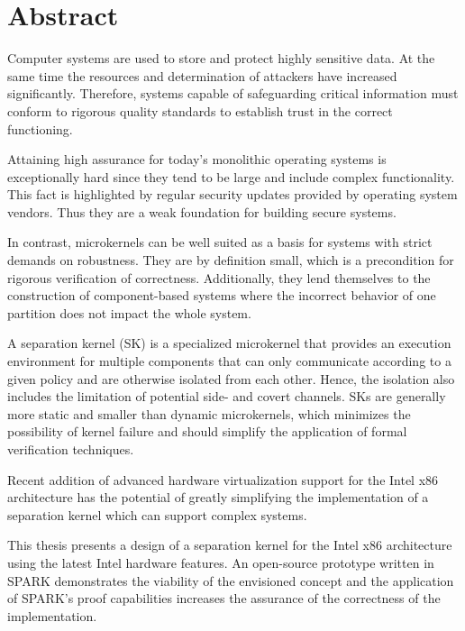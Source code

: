 \chapter*{Abstract}
Computer systems are used to store and protect highly sensitive data. At the
same time the resources and determination of attackers have increased
significantly. Therefore, systems capable of safeguarding critical information
must conform to rigorous quality standards to establish trust in the correct
functioning.

Attaining high assurance for today's monolithic operating systems is
exceptionally hard since they tend to be large and include complex
functionality. This fact is highlighted by regular security updates provided by
operating system vendors. Thus they are a weak foundation for building secure
systems.

In contrast, microkernels can be well suited as a basis for systems with strict
demands on robustness. They are by definition small, which is a precondition
for rigorous verification of correctness. Additionally, they lend themselves to
the construction of component-based systems where the incorrect behavior of one
partition does not impact the whole system.

A separation kernel (SK) is a specialized microkernel that provides an
execution environment for multiple components that can only communicate
according to a given policy and are otherwise isolated from each other. Hence,
the isolation also includes the limitation of potential side- and covert
channels. SKs are generally more static and smaller than dynamic
microkernels, which minimizes the possibility of kernel failure and should
simplify the application of formal verification techniques.

Recent addition of advanced hardware virtualization support for the Intel x86
architecture has the potential of greatly simplifying the implementation of a
separation kernel which can support complex systems.

This thesis presents a design of a separation kernel for the Intel x86
architecture using the latest Intel hardware features. An open-source prototype
written in SPARK demonstrates the viability of the envisioned concept and the
application of SPARK's proof capabilities increases the assurance of the
correctness of the implementation.
